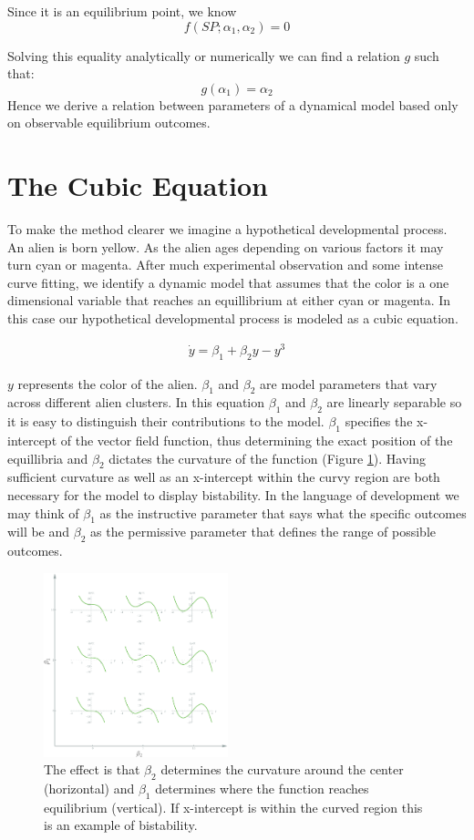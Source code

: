 \documentclass[letterpaper]{article}
\begin{document}
Since it is an equilibrium point, we know 
\[
  f(SP; \alpha_1,\alpha_2) = 0
  \]

Solving this equality analytically or numerically we can find a relation $g$
such that:
\[
  g(\alpha_1) = \alpha_2
  \]
Hence we derive a relation between parameters of a dynamical model based only on 
observable equilibrium outcomes.

\section{The Cubic Equation}
To make the method clearer we imagine a hypothetical developmental
process. An alien is born yellow. As the alien ages depending
on various factors it may turn cyan or magenta. After much experimental observation
and some intense curve fitting, we identify a dynamic
model that assumes that the color is a one dimensional variable that reaches 
an equillibrium at either cyan or magenta. In this case our hypothetical developmental
process is modeled as a cubic equation.

\begin{eqnarray}
    \dot{y} = \beta_1 + \beta_2 y - y^3
\end{eqnarray}

$y$ represents the color of the alien. $\beta_1$ and $\beta_2$ are model 
parameters that vary across different alien clusters. In this equation $\beta_1$ and
$\beta_2$ are linearly separable so it is easy to distinguish their contributions 
to the model. $\beta_1$ specifies the x-intercept of the vector field function,
thus determining the exact position of the equillibria and $\beta_2$ dictates the 
curvature of the function (Figure \ref{cubic_params}). 
Having sufficient curvature as well as an x-intercept
within the curvy region are both necessary for the model to display bistability.
In the language of development we may think of $\beta_1$ as the instructive parameter 
that says what the
specific outcomes will be and $\beta_2$ as the permissive parameter that defines the
range of possible outcomes.

\begin{figure}[t]
\begin{center}
\includegraphics[width=2.1in,angle=0]{./cubic_params.png}
\caption{The effect is that $\beta_2$ determines the curvature around the 
center (horizontal)
and $\beta_1$ determines where the function reaches equilibrium (vertical).
If x-intercept is within the curved region this is an example of bistability.}
\label{cubic_params}
\end{center}
\end{figure}
\end{document}
